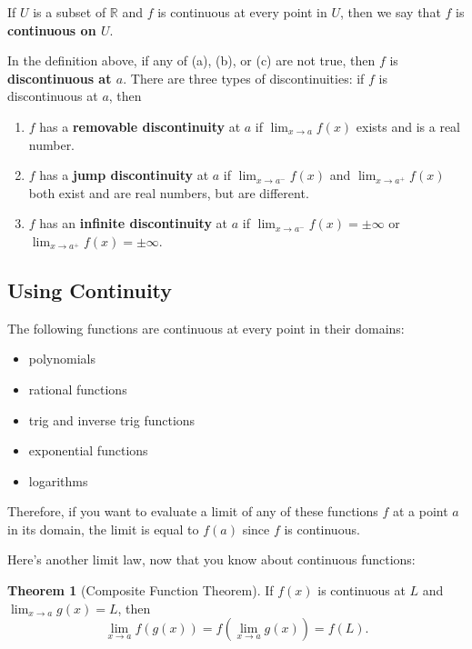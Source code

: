 \documentclass{article}
\newcommand{\R}{\mathbb{R}}
\theoremstyle{definition}
\newtheorem{theorem}{Theorem}[section]
\theoremstyle{definition}
\newenvironment{thm}[1][]{
\begin{tcolorbox}[colback=white!97!black, arc=0in]
\begin{theorem}[#1]
}{
\end{theorem}
\end{tcolorbox}
}
\begin{document}
If $U$ is a subset of $\R$ and $f$ is continuous at every point in $U$, then we say that $f$ is \textbf{continuous on $U$}.

In the definition above, if any of (a), (b), or (c) are not true, then $f$ is \textbf{discontinuous at $a$}. There are three types of discontinuities: if $f$ is discontinuous at $a$, then
\begin{enumerate}
\item $f$ has a \textbf{removable discontinuity} at $a$ if $\displaystyle\lim _{x \to a} f(x)$ exists and is a real number.
\item $f$ has a \textbf{jump discontinuity} at $a$ if $\displaystyle\lim _{x \to a^{-}} f(x)$ and $\displaystyle\lim _{x \to a^{+}} f(x)$ both exist and are real numbers, but are different.
\item $f$ has an \textbf{infinite discontinuity} at $a$ if $\displaystyle\lim _{x \to a^{-}} f(x)=\pm \infty$ or $\displaystyle\lim _{x \to a^{+}} f(x)=\pm \infty$.
\end{enumerate}

\subsection{Using Continuity}

The following functions are continuous at every point in their domains:
\begin{itemize}
\item polynomials
\item rational functions
\item trig and inverse trig functions
\item exponential functions
\item logarithms
\end{itemize}

Therefore, if you want to evaluate a limit of any of these functions $f$ at a point $a$ in its domain, the limit is equal to $f(a)$ since $f$ is continuous.

\vspace{1em}

\noindent Here's another limit law, now that you know about continuous functions:

\begin{thm}[Composite Function Theorem]
If $f(x)$ is continuous at $L$ and $\displaystyle\lim _{x \to a} g(x)=L$, then
$$\lim _{x \to a} f(g(x))=f\left(\lim _{x \to a} g(x)\right)=f(L).$$
\end{thm}
\end{document}
